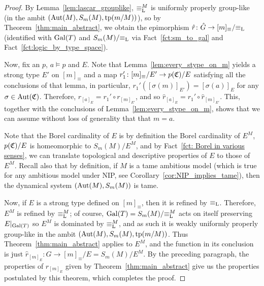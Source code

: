 	\begin{proof}
		By Lemma~\ref{lem:lascar_grouplike}, $\equiv_{\mathrm{L}}^M$ is uniformly properly group-like (in the ambit $(\operatorname{{Aut}}(M),S_m(M),\operatorname{{tp}}(m/M))$), so by Theorem~\ref{thm:main_abstract}, we obtain the epimorphism $\hat r \colon \hat G\to [m]_{\equiv}/{\equiv_{\mathrm{L}}}$ (identified with $\operatorname{{Gal}}(T)$ and $S_m(M)/{\equiv_{\mathrm{L}}}$ via Fact~\ref{fct:sm_to_gal} and Fact~\ref{fct:logic_by_type_space}).
		
		Now, fix an $p$, $a\models p$ and $E$. Note that Lemma~\ref{lem:every_stype_on_m} yields a strong type $E'$ on $[m]_\equiv$ and a map $r_1'\colon [m]_\equiv/E' \to p({\mathfrak C})/E$ satisfying all the conclusions of that lemma, in particular, $r_1'([\sigma(m)]_{E'})= [\sigma(a)]_E$ for any $\sigma \in \operatorname{{Aut}}({\mathfrak C})$. Therefore, $r_{[a]_E}=r_1'\circ r_{[m]_{E'}}$, and so $\hat r_{[a]_E}=r_1'\circ \hat r_{[m]_{E'}}$. This, together with the conclusions of Lemma~\ref{lem:every_stype_on_m}, shows that we can assume without loss of generality that that $m=a$.
		
		Note that the Borel cardinality of $E$ is by definition the Borel cardinality of $E^M$, $p({\mathfrak C})/E$ is homeomorphic to $S_m(M)/E^M$, and by Fact~\ref{fct: Borel in various senses}, we can translate topological and descriptive properties of $E$ to those of $E^M$. Recall also that by definition, if $M$ is a tame ambitious model (which is true for any ambitious model under NIP, see Corollary~\ref{cor:NIP_implies_tame}), then the dynamical system $(\operatorname{{Aut}}(M),S_m(M))$ is tame.
		
		Now, if $E$ is a strong type defined on $[m]_{\equiv}$, then it is refined by $\equiv_{\mathrm{L}}$. Therefore, $E^M$ is refined by $\equiv_{\mathrm{L}}^M$; of course, $\operatorname{{Gal}}(T)=S_m(M)/{\equiv_{\mathrm{L}}^M}$ acts on itself preserving $E|_{\operatorname{{Gal}}(T)}$ so $E^M$ is dominated by $\equiv_{\mathrm{L}}^M$, and as such it is weakly uniformly properly group-like in the ambit $(\operatorname{{Aut}}(M),S_m(M),\operatorname{{tp}}(m/M))$. Thus Theorem~\ref{thm:main_abstract} applies to $E^M$, and the function in its conclusion is just $\hat r_{[m]_{E}}\colon \hat G\to [m]_{\equiv}/E=S_m(M)/E^M$. By the preceding paragraph, the properties of $\hat r_{[m]_{E}}$ given by Theorem~\ref{thm:main_abstract} give us the properties postulated by this theorem, which completes the proof.
	\end{proof}
	
	
	
